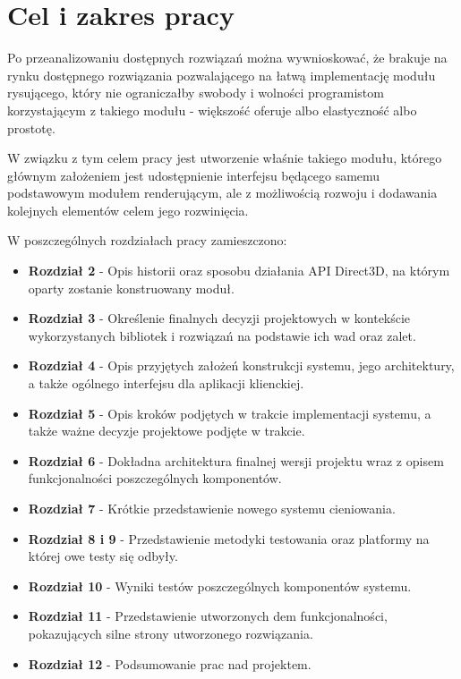 \section{Cel i zakres pracy}
	Po przeanalizowaniu dostępnych rozwiązań można wywnioskować, że brakuje na rynku dostępnego rozwiązania pozwalającego na łatwą implementację modułu rysującego, który nie ograniczałby swobody i wolności programistom korzystającym z takiego modułu - większość oferuje albo elastyczność albo prostotę. 
	
	W związku z tym celem pracy jest utworzenie właśnie takiego modułu, którego głównym założeniem jest udostępnienie interfejsu będącego samemu podstawowym modułem renderującym, ale z możliwością rozwoju i dodawania kolejnych elementów celem jego rozwinięcia. 
	
	W poszczególnych rozdziałach pracy zamieszczono:
	
	\begin{itemize}
		\item \textbf{Rozdział 2} - Opis historii oraz sposobu działania API Direct3D, na którym oparty zostanie konstruowany moduł.
		\item \textbf{Rozdział 3} - Określenie finalnych decyzji projektowych w kontekście wykorzystanych bibliotek i rozwiązań na podstawie ich wad oraz zalet. 
		\item \textbf{Rozdział 4} - Opis przyjętych założeń konstrukcji systemu, jego architektury, a także ogólnego interfejsu dla aplikacji klienckiej.
		\item \textbf{Rozdział 5} - Opis kroków podjętych w trakcie implementacji systemu, a także ważne decyzje projektowe podjęte w trakcie.
		\item \textbf{Rozdział 6} - Dokładna architektura finalnej wersji projektu wraz z opisem funkcjonalności poszczególnych komponentów.
		\item \textbf{Rozdział 7} - Krótkie przedstawienie nowego systemu cieniowania.
		\item \textbf{Rozdział 8 i 9} - Przedstawienie metodyki testowania oraz platformy na której owe testy się odbyły. 
		\item \textbf{Rozdział 10} - Wyniki testów poszczególnych komponentów systemu.
		\item \textbf{Rozdział 11} - Przedstawienie utworzonych dem funkcjonalności, pokazujących silne strony utworzonego rozwiązania.
		\item \textbf{Rozdział 12} - Podsumowanie prac nad projektem.
	\end{itemize}